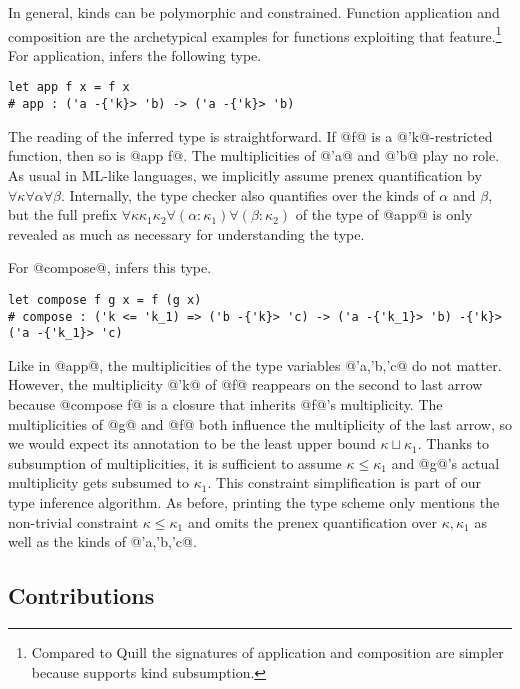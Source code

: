 In general, kinds can be polymorphic and constrained. Function
application and composition are the archetypical
examples for functions exploiting that feature.\footnote{Compared to
  Quill \cite{DBLP:conf/icfp/Morris16} the signatures of application and
  composition are simpler because \lang{} supports kind subsumption.}
For application, \lang{} infers the following type.
\begin{lstlisting}
let app f x = f x
# app : ('a -{'k}> 'b) -> ('a -{'k}> 'b)
\end{lstlisting}
The reading of the inferred type is straightforward. If
@f@ is a @'k@-restricted function, then so is
@app f@. The multiplicities of @'a@ and
@'b@ play no role. As usual in ML-like languages, we
implicitly assume prenex quantification by
$\forall\kappa\forall\alpha\forall\beta$. Internally, the
type checker also quantifies over the kinds of $\alpha$ and $\beta$,
but the full prefix
$\forall\kappa\kappa_1\kappa_2\forall(\alpha:\kappa_1)\forall(\beta:\kappa_2)$
of the type of @app@ is only revealed as much as necessary for
understanding the type. 

For @compose@, \lang{} infers this type.
\begin{lstlisting}
let compose f g x = f (g x)
# compose : ('k <= 'k_1) => ('b -{'k}> 'c) -> ('a -{'k_1}> 'b) -{'k}> ('a -{'k_1}> 'c)
\end{lstlisting}
Like in @app@, the multiplicities of the type variables
@'a,'b,'c@ do not matter. However, the multiplicity
@'k@ of @f@ reappears on the second to last arrow
because @compose f@ is a closure that inherits
@f@'s multiplicity. The multiplicities of @g@  and
@f@ both influence the multiplicity of the last arrow, so
we would expect its annotation to be the least upper bound
$\kappa \sqcup \kappa_1$. Thanks to subsumption of multiplicities, it
is sufficient to assume $\kappa \le \kappa_1$ and @g@'s
actual multiplicity gets subsumed to $\kappa_1$. This constraint
simplification is part of our type inference algorithm. As before,
printing the type scheme only mentions the non-trivial constraint 
$\kappa\le\kappa_1$ and omits the prenex quantification over $\kappa,
\kappa_1$ as well as the kinds of @'a,'b,'c@.

\lstDeleteShortInline@

\subsection{Contributions}
\label{sec:contributions}

